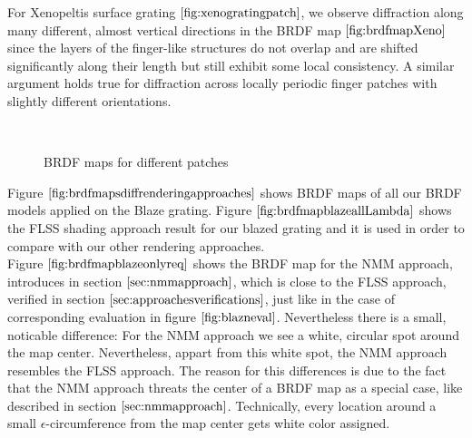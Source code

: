 For Xenopeltis surface grating $\ref{fig:xenogratingpatch}$, we observe diffraction along many different, almost vertical directions in the BRDF map $\ref{fig:brdfmapXeno}$ since the layers of the finger-like structures do not overlap and are shifted significantly along their length but still exhibit some local consistency. A similar argument holds true for diffraction across locally periodic finger patches with slightly different orientations. 

\begin{figure}[H]
  \centering
~
~

\caption[BRDF Map: FLSS Approach applied on various Gratings]{BRDF maps for different patches}
\label{fig:brdfmapsdiffpatches}
\end{figure}


Figure $\ref{fig:brdfmapsdiffrenderingapproaches}$ shows BRDF maps of all our BRDF models applied on the Blaze grating. Figure $\ref{fig:brdfmapblazeallLambda}$ shows the FLSS shading approach result for our blazed grating and it is used in order to compare with our other rendering approaches. \\

Figure $\ref{fig:brdfmapblazeonlyreq}$ shows the BRDF map for the NMM approach, introduces in section $\ref{sec:nmmapproach}$, which is close to the FLSS approach, verified in section $\ref{sec:approachesverifications}$, just like in the case of corresponding evaluation in figure $\ref{fig:blazneval}$. Nevertheless there is a small, noticable difference: For the NMM approach we see a white, circular spot around the map center. Nevertheless, appart from this white spot, the NMM approach resembles the FLSS approach. The reason for this differences is due to the fact that the NMM approach threats the center of a BRDF map as a special case, like described in section $\ref{sec:nmmapproach}$. Technically, every location around a small $\epsilon$-circumference from the map center gets white color assigned. \\

